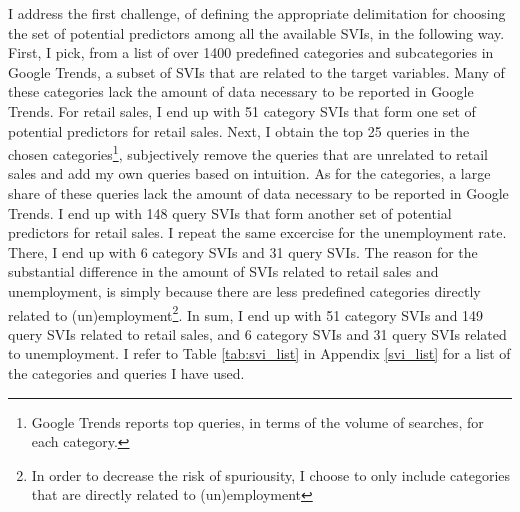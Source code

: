 I address the first challenge, of defining the appropriate delimitation for choosing the set of potential predictors among all the available SVIs, in the following way. First, I pick, from a list of over 1400 predefined categories and subcategories in Google Trends, a subset of SVIs that are related to the target variables. Many of these categories lack the amount of data necessary to be reported in Google Trends. For retail sales, I end up with 51 category SVIs that form one set of potential predictors for retail sales. Next, I obtain the top 25 queries in the chosen categories\footnote{Google Trends reports top queries, in terms of the volume of searches, for each category.}, subjectively remove the queries that are unrelated to retail sales and add my own queries based on intuition. As for the categories, a large share of these queries lack the amount of data necessary to be reported in Google Trends. I end up with 148 query SVIs that form another set of potential predictors for retail sales. I repeat the same excercise for the unemployment rate. There, I end up with 6 category SVIs and 31 query SVIs. The reason for the substantial difference in the amount of SVIs related to retail sales and unemployment, is simply because there are less predefined categories directly related to (un)employment\footnote{In order to decrease the risk of spuriousity, I choose to only include categories that are directly related to (un)employment}. 
In sum, I end up with 51 category SVIs and 149 query SVIs related to retail sales, and 6 category SVIs and 31 query SVIs related to unemployment. I refer to Table \ref{tab:svi_list} in Appendix \ref{svi_list} for a list of the categories and queries I have used.

